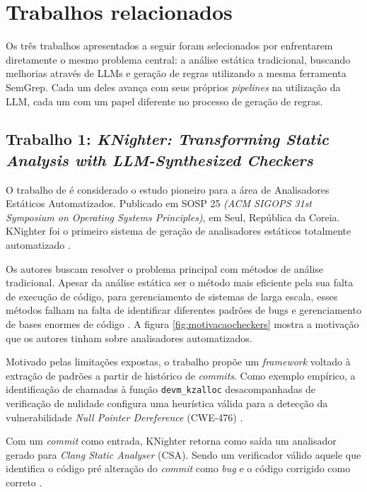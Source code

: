 \documentclass[
    12pt,                %
    openright,           %
    oneside,             %
    a4paper,             %
    english,             %
    brazil               %
]{abntex2}
\begin{document}
\section{Trabalhos relacionados}
\label{sec:trabalhosrelacionados}

Os três trabalhos apresentados a seguir foram selecionados por enfrentarem diretamente o mesmo problema central: a análise estática tradicional, buscando melhorias através de LLMs e geração de regras utilizando a mesma ferramenta SemGrep.
Cada um deles avança com seus próprios \textit{pipelines} na utilização da LLM, cada um com um papel diferente no processo de geração de regras.

\subsection{Trabalho 1: \textit{KNighter: Transforming Static Analysis with LLM-Synthesized Checkers} \cite{yang2025knighter}}
\par
O trabalho de  é considerado o estudo pioneiro para a área de Analisadores Estáticos Automatizados.
Publicado em SOSP 25 \textit{(ACM SIGOPS 31st Symposium on Operating Systems Principles)}, em Seul, República da Coreia.
KNighter foi o primeiro sistema de geração de analisadores estáticos totalmente automatizado \cite{yang2025knighter}.
\par
Os autores buscam resolver o problema principal com métodos de análise tradicional.
Apesar da análise estática ser o método mais eficiente pela sua falta de execução de código, para gerenciamento de sistemas de larga escala, esses métodos falham na falta de identificar diferentes padrões de bugs e gerenciamento de bases enormes de código \cite{yang2025knighter}.
A figura \ref{fig:motivacaocheckers} mostra a motivação que os autores tinham sobre analisadores automatizados.
\par
Motivado pelas limitações expostas, o trabalho propõe um \textit{framework} voltado à extração de padrões a partir de histórico de \textit{commits}.
Como exemplo empírico, a identificação de chamadas à função \texttt{devm\_kzalloc} desacompanhadas de verificação de nulidade configura uma heurística válida para a detecção da vulnerabilidade \textit{Null Pointer Dereference} (CWE-476) \cite{yang2025knighter}.
\par
Com um \textit{commit} como entrada, KNighter retorna como saída um analisador gerado para \textit{Clang Static Analyser} (CSA). Sendo um verificador válido aquele que identifica o código pré alteração do \textit{commit} como \textit{bug} e o código corrigido como correto \cite{yang2025knighter}.
\end{document}
